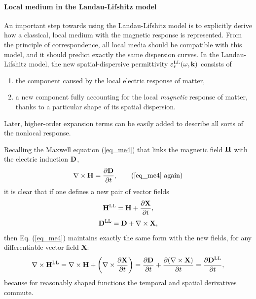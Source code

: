\paragraph{Local medium in the Landau-Lifshitz model} %
An important step towards using the Landau-Lifshitz model is to explicitly derive how a classical, local medium with the magnetic response is represented. From the principle of correspondence, all local media should be compatible with this model, and it should predict exactly the same dispersion curves. In the Landau-Lifshitz model, the new spatial-dispersive permittivity $\varepsilon_r^\text{LL}(\omega, {\mathbf{k}})$ consists of
\begin{enumerate}
 \item{the component caused by the local electric response of matter,} 
 \item{a new component fully accounting for the local \textit{magnetic} response of matter, thanks to a particular shape of its spatial dispersion.}
\end{enumerate}
Later, higher-order expansion terms can be easily added to describe all sorts of the nonlocal response.

Recalling the Maxwell equation (\ref{eq_me4}) that links the magnetic field $\mathbf{H}$ with the electric induction $\mathbf{D}$, 
\begin{equation} \nabla \times \HH =  \frac{\partial \D} {\partial t}, \tag{\ref{eq_me4} \again} \end{equation}
it is clear that if one defines a new pair of vector fields
\begin{equation} {\mathbf{H}^\text{LL}} = \mathbf{H} + \frac{\partial\mathbf{X}}{\partial t}, \label{eq_HHsd}\end{equation}
\begin{equation} {\mathbf{D}^\text{LL}}  = \mathbf{D}  + \nabla\times \mathbf{X}, \label{eq_Dsd}\end{equation}
then Eq. (\ref{eq_me4}) maintains exactly the same form with the new fields, for any differentiable vector field $\mathbf{X}$:
\begin{equation} \nabla \times {\mathbf{H}^\text{LL}} = \nabla \times \mathbf{H} + \left(\nabla\times \frac{\partial\mathbf{X}}{\partial t}\right) = \frac{\partial \mathbf{D}}{\partial t}+ \frac{\partial(\nabla\times \mathbf{X})}{\partial t} =  \frac{\partial {\mathbf{D}^\text{LL}}} {\partial t}, \label{eq_me4sd} \end{equation}
because for reasonably shaped functions the temporal and spatial derivatives commute.

